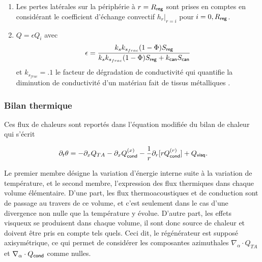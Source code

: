 \begin{enumerate}[label=\textbf{(\roman*)}]
\item Les pertes latérales sur la périphérie à $r=R_{\sf reg}$ sont prises en comptes en considérant le coefficient d'échange convectif $\left.h_r\right|_{r=i}$ pour $i=0,R_{\sf reg}$.

\item {}

$Q=\epsilon Q_i$ avec 
\begin{equation}
	\epsilon = \frac{k_s k_{s_{frac}} (1-\Phi)S_{\sf reg}}{k_s k_{s_{frac}} (1-\Phi)S_{\sf reg} + k_{\sf can} S_{\sf can}}
\end{equation}
et $k_{s_{frac}}=\num{.1}$ le facteur de dégradation de conductivité qui quantifie la diminution de conductivité d'un matériau fait de tissus métalliques \cite{lewis_measurement_1998}.

\end{enumerate}

\subsubsection{Bilan thermique}

Ces flux de chaleurs sont reportés dans l'équation modifiée du bilan de chaleur qui s'écrit


\begin{equation}
[\Phi\rho_0 C_p + (1-\Phi)\rho_s C_s]\ \partial_t \theta = - \partial_x Q_{TA} - \partial_x Q_{\sf cond}^{(x)} - \frac{1}{r}\partial_r[r Q_{\sf cond}^{(r)}] + Q_{\sf visq}.
\label{eq:BilanChaleur_Transitoire_ApDvptCylin}
\end{equation}

Le premier membre désigne la variation d'énergie interne suite à la variation de température, et le second membre, l'expression des flux thermiques dans chaque volume élémentaire. D'une part, les flux thermoacoustiques et de conduction sont \og de passage \fg{} au travers de ce volume, et c'est seulement dans le cas d'une divergence non nulle que la température y évolue. D'autre part, les effets visqueux se produisent dans chaque volume, il sont donc source de chaleur et doivent être pris en compte tels quels. Ceci dit, le régénérateur est supposé axisymétrique, ce qui permet de considérer les composantes azimuthales $\nabla_\alpha \cdot Q_{TA}$ et $\nabla_\alpha \cdot Q_{\sf cond}$ comme nulles.

